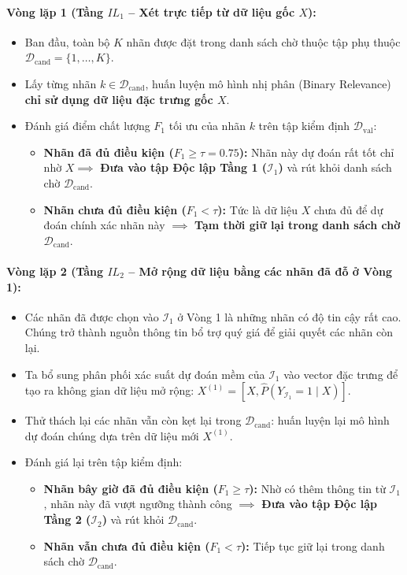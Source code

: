 \documentclass[11pt,a4paper]{article}
\begin{document}
\paragraph{Vòng lặp 1 (Tầng $IL_1$ -- Xét trực tiếp từ dữ liệu gốc $X$):}
\begin{itemize}
    \item Ban đầu, toàn bộ $K$ nhãn được đặt trong danh sách chờ thuộc tập phụ thuộc $\mathcal{D}_{\text{cand}} = \{1, \dots, K\}$.
    \item Lấy từng nhãn $k \in \mathcal{D}_{\text{cand}}$, huấn luyện mô hình nhị phân (Binary Relevance) \textbf{chỉ sử dụng dữ liệu đặc trưng gốc $X$}.
    \item Đánh giá điểm chất lượng $F_1$ tối ưu của nhãn $k$ trên tập kiểm định $\mathcal{D}_{\text{val}}$:
    \begin{itemize}
        \item \textbf{Nhãn đã đủ điều kiện ($F_1 \ge \tau = 0.75$):} Nhãn này dự đoán rất tốt chỉ nhờ $X \implies$ \textbf{Đưa vào tập Độc lập Tầng 1 ($\mathcal{I}_1$)} và rút khỏi danh sách chờ $\mathcal{D}_{\text{cand}}$.
        \item \textbf{Nhãn chưa đủ điều kiện ($F_1 < \tau$):} Tức là dữ liệu $X$ chưa đủ để dự đoán chính xác nhãn này $\implies$ \textbf{Tạm thời giữ lại trong danh sách chờ $\mathcal{D}_{\text{cand}}$}.
    \end{itemize}
\end{itemize}

\paragraph{Vòng lặp 2 (Tầng $IL_2$ -- Mở rộng dữ liệu bằng các nhãn đã đỗ ở Vòng 1):}
\begin{itemize}
    \item Các nhãn đã được chọn vào $\mathcal{I}_1$ ở Vòng 1 là những nhãn có độ tin cậy rất cao. Chúng trở thành nguồn thông tin bổ trợ quý giá để giải quyết các nhãn còn lại.
    \item Ta bổ sung phân phối xác suất dự đoán mềm của $\mathcal{I}_1$ vào vector đặc trưng để tạo ra không gian dữ liệu mở rộng: $X^{(1)} = [X, \hat{P}(Y_{\mathcal{I}_1} = 1 \mid X)]$.
    \item Thử thách lại các nhãn vẫn còn kẹt lại trong $\mathcal{D}_{\text{cand}}$: huấn luyện lại mô hình dự đoán chúng dựa trên dữ liệu mới $X^{(1)}$.
    \item Đánh giá lại trên tập kiểm định:
    \begin{itemize}
        \item \textbf{Nhãn bây giờ đã đủ điều kiện ($F_1 \ge \tau$):} Nhờ có thêm thông tin từ $\mathcal{I}_1$, nhãn này đã vượt ngưỡng thành công $\implies$ \textbf{Đưa vào tập Độc lập Tầng 2 ($\mathcal{I}_2$)} và rút khỏi $\mathcal{D}_{\text{cand}}$.
        \item \textbf{Nhãn vẫn chưa đủ điều kiện ($F_1 < \tau$):} Tiếp tục giữ lại trong danh sách chờ $\mathcal{D}_{\text{cand}}$.
    \end{itemize}
\end{itemize}
\end{document}
